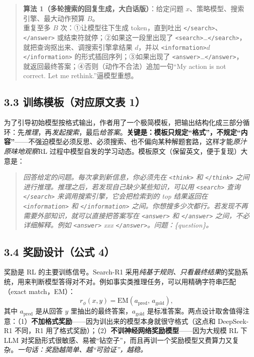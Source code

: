 \documentclass[11pt,UTF8,fontset=fandol]{ctexart}
\newcommand{\tg}[1]{\texttt{<#1>}}
\begin{document}
\begin{quote}\small
\textbf{算法 1（多轮搜索的回复生成，大白话版）}：给定问题 $x$、策略模型、搜索引擎、最大动作预算 $B$。\\
重复至多 $B$ 次：①让模型往下生成 token，直到吐出 \tg{/search}、\tg{/answer} 或结束符就停；②如果这一段里出现了 \tg{search}…\tg{/search}，就把查询抠出来、调搜索引擎拿结果 $d$，并以 \tg{information}$d$\tg{/information} 的形式插回序列；③如果出现了 \tg{answer}…\tg{/answer}，就返回最终答案；④否则（动作不合法）追加一句“My action is not correct. Let me rethink.”逼模型重想。
\end{quote}

\subsection{3.3 训练模板（对应原文表 1）}

为了引导初始模型按格式输出，作者用了一个极简模板，把输出结构化成三部分循环：先\emph{推理}，再\emph{发起搜索}，最后\emph{给答案}。\textbf{关键是：模板只规定“格式”，不规定“内容”}——不强迫模型必须反思、必须搜索、也不偏向某种解题套路，这样才能\emph{原汁原味地观察}RL 过程中模型自发的学习动态。模板原文（保留英文，便于复现）大意是：

\begin{quote}\small\itshape
回答给定的问题。每次拿到新信息，你必须先在 \tg{think} 和 \tg{/think} 之间进行推理。推理之后，若发现自己缺少某些知识，可以用 \tg{search} 查询 \tg{/search} 来调用搜索引擎，它会把检索到的 top 结果返回在 \tg{information} 和 \tg{/information} 之间。你想搜多少次都行。若发现不再需要外部知识，就可以直接把答案写在 \tg{answer} 和 \tg{/answer} 之间，不必详细解释。例如 \tg{answer} xxx \tg{/answer}。问题：\{question\}。
\end{quote}

\subsection{3.4 奖励设计（公式 4）}

奖励是 RL 的主要训练信号。Search-R1 采用\emph{纯基于规则、只看最终结果}的奖励系统，用来判断模型答得对不对。例如事实类推理任务，可以用精确字符串匹配（exact match，EM）：
\begin{equation*}
r_\phi(x,y)=\mathrm{EM}(a_{\mathrm{pred}},\, a_{\mathrm{gold}}),
\tag{4}
\end{equation*}
其中 $a_{\mathrm{pred}}$ 是从回答 $y$ 里抽出的最终答案，$a_{\mathrm{gold}}$ 是标准答案。两点设计取舍值得注意：（1）\textbf{不加格式奖励}——因为训出来的模型本身就很守格式（这点和 DeepSeek-R1 不同，R1 用了格式奖励）；（2）\textbf{不训神经网络奖励模型}——因为大规模 RL 下 LLM 对奖励形式很敏感、易被“钻空子”，而且再训一个奖励模型又费算力又复杂。\emph{一句话：奖励越简单、越“可验证”，越稳。}
\end{document}
